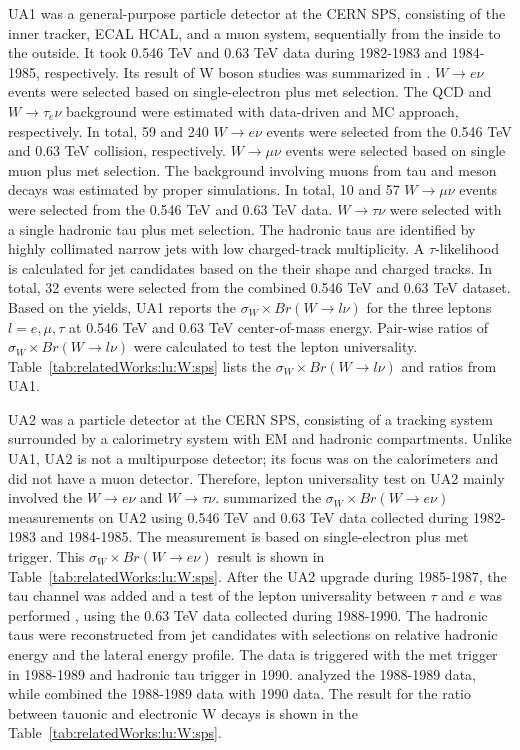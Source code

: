 UA1 was a general-purpose particle detector at the CERN SPS, consisting of the inner tracker, ECAL HCAL, and a muon system, sequentially from the inside to the outside.  It took 0.546 TeV and 0.63 TeV data during 1982-1983 and 1984-1985, respectively. Its result of W boson studies was summarized in \cite{Albajar:1988ka}. $W \to e \nu$ events were selected based on single-electron plus met selection. The QCD and $W\to \tau_e \nu$ background were estimated with data-driven and MC approach, respectively. In total, 59 and 240 $W \to e \nu$ events were selected from the 0.546 TeV and 0.63 TeV collision, respectively.  $W \to \mu \nu$ events were selected based on single muon plus met selection. The background involving muons from tau and meson decays was estimated by proper simulations. In total, 10 and 57 $W\to \mu\nu$ events were selected from the 0.546 TeV and 0.63 TeV data.  $W\to \tau \nu$ were selected with a single hadronic tau plus met selection. The hadronic taus are identified by highly collimated narrow jets with low charged-track multiplicity.  A $\tau$-likelihood is calculated for jet candidates based on the their shape and charged tracks. In total, 32 events were selected from the combined 0.546 TeV and 0.63 TeV dataset. Based on the yields, UA1 reports the $\sigma_W \times Br(W\to l\nu) $ for the three leptons $l=e,\mu,\tau$ at 0.546 TeV and 0.63 TeV center-of-mass energy. Pair-wise ratios of  $\sigma_W \times Br(W\to l\nu) $ were calculated to test the lepton universality. Table~\ref{tab:relatedWorks:lu:W:sps} lists the $\sigma_W \times Br(W\to l\nu) $ and ratios from UA1.



UA2 was a particle detector at the CERN SPS, consisting of a tracking system surrounded by a calorimetry system with EM and hadronic compartments. Unlike UA1, UA2 is not a multipurpose detector; its focus was on the calorimeters and did not have a muon detector. Therefore, lepton universality test on UA2 mainly involved the $W \to e\nu$ and $W \to \tau \nu$. \cite{appel1986measurement} summarized the $\sigma_W \times Br(W\to e \nu) $ measurements on UA2 using 0.546 TeV and 0.63 TeV data collected during 1982-1983 and 1984-1985. The measurement is based on single-electron plus met trigger. This  $\sigma_W \times Br(W\to e \nu) $ result is shown in Table~\ref{tab:relatedWorks:lu:W:sps}. After the UA2 upgrade during 1985-1987,  the tau channel was added and a test of the lepton universality between $\tau$ and $e$ was performed \cite{Alitti:1991eh, Alitti:1992hv}, using the 0.63 TeV data collected during 1988-1990. The hadronic taus were reconstructed from jet candidates with selections on relative hadronic energy and the lateral energy profile. The data is triggered with the met trigger in 1988-1989 and hadronic tau trigger in 1990. \cite{Alitti:1991eh} analyzed the 1988-1989 data, while \cite{Alitti:1992hv} combined the 1988-1989 data with 1990 data. The result \cite{Alitti:1992hv} for the ratio between tauonic and electronic W decays is shown in the Table~\ref{tab:relatedWorks:lu:W:sps}. 


